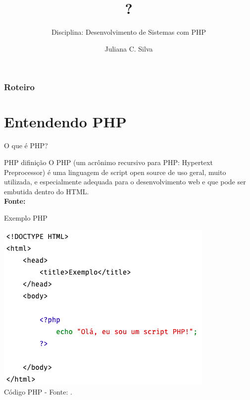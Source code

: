 \documentclass{beamer}
\title[??]{?}
\subtitle{Disciplina: Desenvolvimento de Sistemas com PHP}
\author{Juliana C. Silva}
\institute{Universidade Positivo}
\begin{document}
\frame{\titlepage}
 
\begin{frame}
\frametitle{Roteiro} 
\tableofcontents 
\end{frame}
\section{Entendendo PHP}
\begin{frame}{O que é PHP?}
\begin{block}{PHP difinição}
O PHP (um acrônimo recursivo para PHP: Hypertext Preprocessor) é uma linguagem de script open source de uso geral, muito utilizada, e especialmente adequada para o desenvolvimento web e que pode ser embutida dentro do HTML.\\
\tiny{\textbf{Fonte:} \cite{achout2022php}}
\end{block}
\end{frame}
\begin{frame}{Exemplo PHP}
\begin{center}
		  \includegraphics[height=0.65\paperheight]{fig/aula4/php_aula4_1.png} \\
		  \tiny Código PHP - Fonte: \cite{achout2022php}.
	  \end{center}
    
\end{frame}
\end{document}
